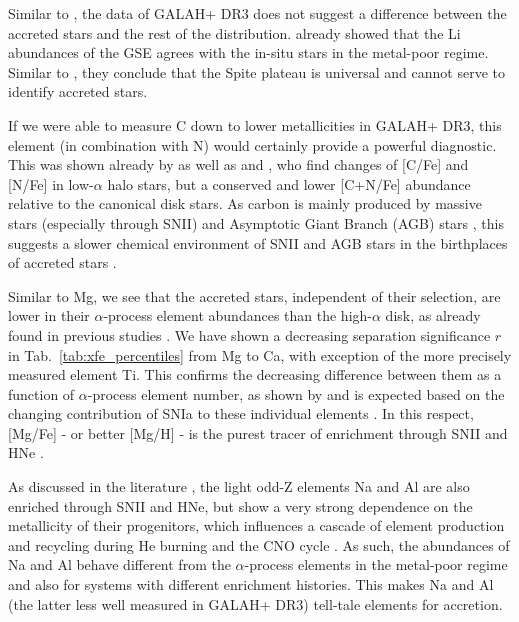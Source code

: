 \documentclass[fleqn,usenatbib]{mnras}
\begin{document}
Similar to \citet{Nissen2012}, the data of GALAH+ DR3 does not suggest a difference between the accreted stars and the rest of the distribution. \citet{Simpson2020} already showed that the Li abundances of the GSE agrees with the in-situ stars in the metal-poor regime. Similar to \citet{Molaro2020}, they conclude that the Spite plateau is universal and cannot serve to identify accreted stars.

If we were able to measure C down to lower metallicities in GALAH+ DR3, this element (in combination with N) would certainly provide a powerful diagnostic. This was shown already by \citet{Nissen2014} as well as \citet{Hawkins2015} and \citet{Hayes2018}, who find changes of [C/Fe] and [N/Fe] in low-$\alpha$ halo stars, but a conserved and lower [C+N/Fe] abundance relative to the canonical disk stars. As carbon is mainly produced by massive stars (especially through SNII) and Asymptotic Giant Branch (AGB) stars \citep{Kobayashi2020}, this suggests a slower chemical environment of SNII and AGB stars in the birthplaces of accreted stars \citep[see][for further discussion]{Nissen2014}.

Similar to Mg, we see that the accreted stars, independent of their selection, are lower in their $\alpha$-process element abundances than the high-$\alpha$ disk, as already found in previous studies \citep{Venn2004, Nissen2010, Hawkins2015, Hayes2018, Koppelman2019, Koppelman2021, Recio-Blanco2021, DiMatteo2020, Matsuno2021}. We have shown a decreasing separation significance $r$ in Tab.~\ref{tab:xfe_percentiles} from Mg to Ca, with exception of the more precisely measured element Ti. This confirms the decreasing difference between them as a function of $\alpha$-process element number, as shown by \citet{Hayes2018} and is expected based on the changing contribution of SNIa to these individual elements \citep{Tsujimoto1995}. In this respect, [Mg/Fe] - or better [Mg/H] \citep{Feuillet2021} - is the purest tracer of enrichment through SNII and HNe \citep{Kobayashi2020}.

As discussed in the literature \citep{Nissen2010, Hawkins2015, Hayes2018}, the light odd-Z elements Na and Al are also enriched through SNII and HNe, but show a very strong dependence on the metallicity of their progenitors, which influences a cascade of element production and recycling during He burning and the CNO cycle \citep[e.g.][]{Woosley2002, Kobayashi2006, Kobayashi2020}. As such, the abundances of Na and Al behave different from the $\alpha$-process elements in the metal-poor regime and also for systems with different enrichment histories. This makes Na and Al (the latter less well measured in GALAH+ DR3) tell-tale elements for accretion.
\end{document}
